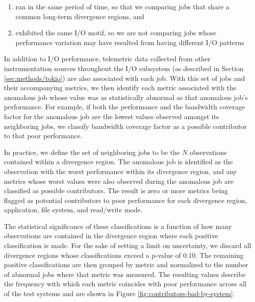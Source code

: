 \begin{enumerate}[leftmargin=*]
\item ran in the same period of time, so that we comparing jobs that share a common long-term divergence regions, and
\item exhibited the same I/O motif, so we are not comparing jobs whose performance variation may have resulted from having different I/O patterns
\end{enumerate}

In addition to I/O performance, telemetric data collected from other instrumentation sources throughout the I/O subsystem (as described in Section \ref{sec:methods/tokio}) are also associated with each job.
With this set of jobs and their accompanying metrics, we then identify each metric associated with the anomalous job whose value was as statistically abnormal as that anomalous job's performance.
For example, if both the performance and the bandwidth coverage factor for the anomalous job are the lowest values observed amongst its neighboring jobs, we classify bandwidth coverage factor as a possible contributor to that poor performance.

In practice, we define the set of neighboring jobs to be the $N$ observations contained within a divergence region.
The anomalous job is identified as the observation with the worst performance within its divergence region, and any metrics whose worst values were also observed during the anomalous job are classified as possible contributors.
The result is zero or more metrics being flagged as potential contributors to poor performance for each divergence region, application, file system, and read/write mode.

The statistical significance of these classifications is a function of how many observations are contained in the divergence region where each positive classification is made.
For the sake of setting a limit on uncertainty, we discard all divergence regions whose classifications exceed a p-value of 0.10.
The remaining positive classifications are then grouped by metric and normalized to the number of abnormal jobs where that metric was measured.
The resulting values describe the frequency with which each metric coincides with poor performance across all of the test systems and are shown in Figure \ref{fig:contributors-bad-by-system}.

